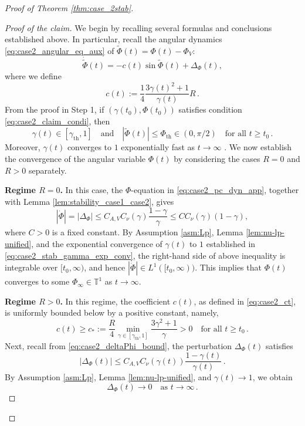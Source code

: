 \documentclass[10pt]{article}
\theoremstyle{definition}
\theoremstyle{definition}
\numberwithin{equation}{section}
\newcommand{\BBT}{\mathbb{T}}
\newcommand{\DPhi}{\Dot{\Phi}}
\newcommand{\gammaTH}{\gamma_{\mathrm{th}}}
\newcommand{\DeltaPhi}{\Delta_{\Phi}}
\newcommand{\PhiV}{\Phi_{V}}
\newcommand{\WPhi}{\widetilde{\Phi}}
\newcommand{\PhiTH}{\Phi_{\mathrm{th}}}
\begin{document}
\begin{proof}[Proof of Theorem \ref{thm:case_2stab}]
\begin{proof}[Proof of the claim]
We begin by recalling several formulas and conclusions established above.
In particular, recall the angular dynamics \eqref{eq:case2_angular_eq_aux} of $\WPhi(t) = \Phi(t) - \PhiV$:
\begin{equation*}
\dot \WPhi(t) = -c(t) \sin \WPhi(t) + \DeltaPhi(t),
\end{equation*}
where we define
\begin{equation}\label{eq:case2_ct}
    c(t) := \frac{1}{4} \frac{3\gamma(t)^2 + 1}{\gamma(t)} R \, .
\end{equation}
From the proof in Step 1, if $(\gamma(t_0), \Phi(t_0))$ satisfies condition \eqref{eq:case2_claim_condi}, then
\begin{equation*}
\gamma(t) \in [\gammaTH, 1] \quad \text{and} \quad |\WPhi(t)| \leq \PhiTH \in (0, \pi/2) \quad \text{for all } t \geq t_0 \, .
\end{equation*}
Moreover, $\gamma(t)$ converges to $1$ exponentially fast as $t \rightarrow \infty$ .
We now establish the convergence of the angular variable $\Phi(t)$ by considering the cases $R=0$ and $R>0$ separately.

\textbf{Regime $R = 0$.}
In this case, the $\Phi$-equation in \eqref{eq:case2_pc_dyn_app}, together with Lemma \ref{lem:stability_case1_case2}, gives
\begin{equation*}
|\DPhi| = |\DeltaPhi| \leq C_{A,V} C_{\nu} (\gamma) \frac{1 - \gamma}{\gamma} \leq C C_{\nu} (\gamma) (1 - \gamma),
\end{equation*}
where $C > 0$ is a fixed constant.
By Assumption \ref{asm:Lp}, Lemma \ref{lem:nu-lp-unified}, and the exponential convergence of $\gamma(t)$ to $1$ established in \eqref{eq:case2_stab_gamma_exp_conv}, the right-hand side of above inequality is integrable over $[t_0, \infty)$, and hence $|\dot{\Phi}| \in L^1 ([t_0, \infty))$.
This implies that $\Phi(t)$ converges to some $\Phi_{\infty} \in \BBT^1$ as $t \rightarrow \infty$.

\textbf{Regime $R > 0$.}
In this regime, the coefficient $c(t)$, as defined in \eqref{eq:case2_ct}, is uniformly bounded below by a positive constant,
namely,
\begin{equation*}
c(t) \geq c_* := \frac{R}{4} \min_{\gamma \in [\gammaTH, 1]} \frac{3\gamma^2 + 1}{\gamma} > 0 \quad \text{for all } t \geq t_0 \, .
\end{equation*}
Next, recall from \eqref{eq:case2_deltaPhi_bound}, the perturbation $\DeltaPhi(t)$ satisfies
\begin{equation*}
|\DeltaPhi(t)| \leq C_{A,V} C_{\nu} (\gamma(t)) \frac{1 - \gamma(t)}{\gamma(t)} \, .
\end{equation*}
By Assumption \ref{asm:Lp}, Lemma \ref{lem:nu-lp-unified}, and $\gamma(t) \rightarrow 1$, we obtain
\begin{equation*}
    \DeltaPhi(t) \rightarrow 0 \quad \text{as } t \rightarrow \infty \, .
\end{equation*}


\end{proof}
\end{proof}
\end{document}
